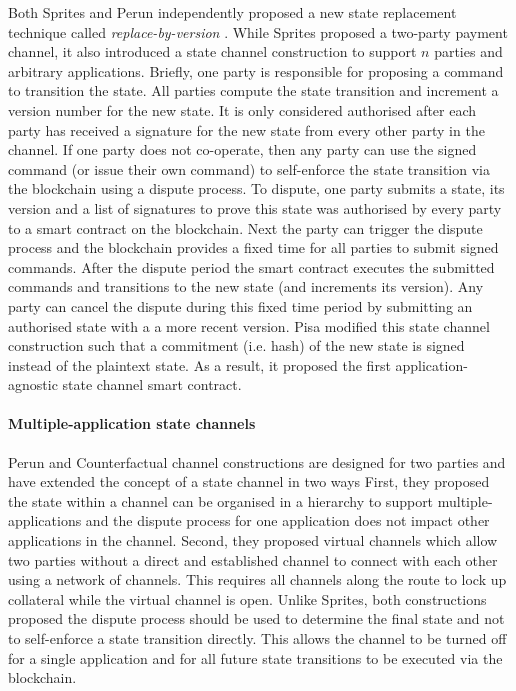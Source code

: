 \documentclass{llncs}
\begin{document}
Both Sprites  and Perun independently proposed a new state replacement technique called \textit{replace-by-version} \cite{miller2017sprites,dziembowski2017perun}. 
While Sprites proposed a two-party payment channel, it also introduced a state channel construction to support $n$ parties and arbitrary applications. 
Briefly, one party is responsible for proposing a command to transition the state.
All parties compute the state transition and increment a version number for the new state. 
It is only considered authorised after each party has received a signature for the new state from every other party in the channel. 
If one party does not co-operate, then any party can use the signed command (or issue their own command) to self-enforce the state transition via the blockchain using a dispute process. 
To dispute, one party submits a state, its version and a list of signatures to prove this state was authorised by every party to a smart contract on the blockchain. 
Next the party can trigger the dispute process and the blockchain provides a fixed time for all parties to submit signed commands. 
After the dispute period the smart contract executes the submitted commands and transitions to the new state (and increments its version).  
Any party can cancel the dispute during this fixed time period by submitting an authorised state with a a more recent version. 
Pisa modified this state channel construction such that a commitment (i.e. hash) of the new state is signed instead of the plaintext state. 
As a result, it proposed the first application-agnostic state channel smart contract. 

\paragraph{Multiple-application state channels} \label{sec:multiapp}
Perun and Counterfactual channel constructions are designed for two parties and have extended the concept of a state channel in two ways \cite{dziembowski2017perun,coleman2018counterfactual} 
First, they proposed the state within a channel can be organised in a hierarchy to support multiple-applications and the dispute process for one application does not impact other applications in the channel. 
Second, they proposed virtual channels which allow two parties without a direct and established channel to connect with each other using a network of channels. 
This requires all channels along the route to lock up collateral while the virtual channel is open. 
Unlike Sprites, both constructions proposed the dispute process should be used to determine the final state and not to self-enforce a state transition directly. 
This allows the channel to be turned off for a single application and for all future state transitions to be executed via the blockchain. 
\end{document}
